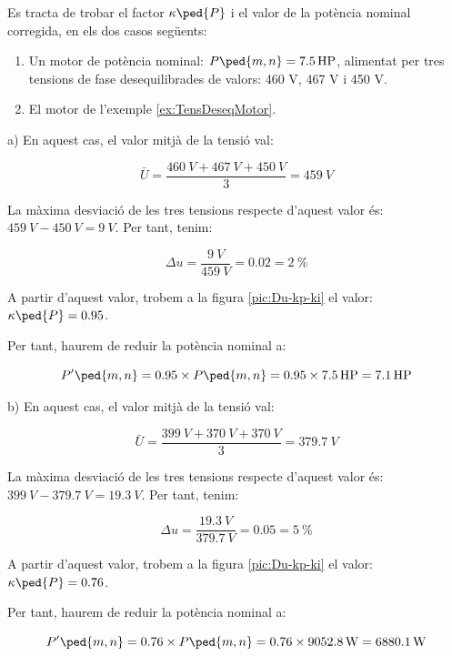 \begin{exemple}[\MotorTensDeseqNEMA{}]
	\addcontentsxms{\MotorTensDeseqNEMA}
Es tracta de trobar el factor $\kappa\ped{P}$  i el valor de la potència nominal corregida, en els dos casos següents:	
    \begin{enumerate}
		\renewcommand{\labelenumi}{\alph{enumi})}
		\item Un motor de  potència nominal: $P\ped{m,n} = \qty{7,5}{HP}$, alimentat per tres tensions de fase desequilibrades   de valors: 460 V, 467 V i 450 V.
		
		\item El motor de l'exemple \vref{ex:TensDeseqMotor}.
	\end{enumerate}
	
	a)  En aquest cas, el valor mitjà de la tensió val:
	
    \[
      \bar{U} = \frac{\qty{460}{V}+\qty{467}{V}+\qty{450}{V}}{3} = \qty{459}{V}
    \]

    La màxima desviació de les tres tensions respecte d'aquest valor és: $\qty{459}{V}-\qty{450}{V} = \qty{9}{V}$. Per tant, tenim:
    
    \[
        \Delta u = \frac{\qty{9}{V}}{\qty{459}{V}} = \num{0,02} = \qty{2}{\%}
    \]

     A partir d'aquest valor, trobem a la figura \vref{pic:Du-kp-ki} el valor:  $\kappa\ped{P} = \num{0,95}$.

     Per tant, haurem de reduir la potència nominal a:
     
     \[
         P'\ped{m,n} = \num{0,95}\times{}P\ped{m,n}  = \num{0,95}\times\qty{7,5}{HP} = \qty{7,1}{HP}
     \]
     
	 b)  En aquest cas, el valor mitjà de la tensió val:
	 
	 \[
	 \bar{U} = \frac{\qty{399}{V}+\qty{370}{V}+\qty{370}{V}}{3} = \qty{379,7}{V}
	 \]
	 
	 La màxima desviació de les tres tensions respecte d'aquest valor és: $\qty{399}{V}-\qty{379,7}{V} = \qty{19,3}{V}$. Per tant, tenim:
	 
	 \[
	 \Delta u = \frac{\qty{19,3}{V}}{\qty{379,7}{V}} = \num{0,05} = \qty{5}{\%}
	 \]
	 
	 A partir d'aquest valor, trobem a la figura \ref{pic:Du-kp-ki} el valor:  $\kappa\ped{P} = \num{0,76}$.    
     
     Per tant, haurem de reduir la potència nominal a:
     
     \[
     P'\ped{m,n} = \num{0,76}\times{}P\ped{m,n}  = \num{0,76}\times\qty{9052,8}{W} = \qty{6880,1}{W}
     \]
\end{exemple}

